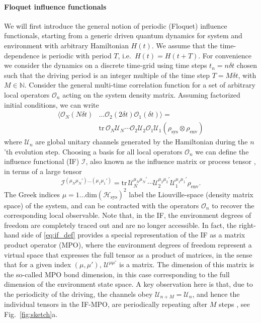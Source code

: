 \documentclass[aps,prb, twocolumn,superscriptaddress]{revtex4-2}
\newcommand{\braket}[1]{\langle#1\rangle}
\newcommand{\tr}{\mathrm{tr}}
\begin{document}
\paragraph*{Floquet influence functionals}

We will first introduce the general notion of periodic (Floquet) influence functionals, starting from a generic driven quantum dynamics for system and environment with arbitrary Hamiltonian $H(t)$. We assume that the time-dependence is periodic with period $T$, i.e.~$H(t)=H(t+T)$. For convenience we consider the dynamics on a discrete time-grid using time steps $t_n=n\delta t$ chosen such that the driving period is an integer multiple of the time step $T=M\delta t$, with $M\in \mathbb{N}$. Consider the general multi-time correlation function for a set of arbitrary local operators $\mathcal{O}_n$ acting on the system density matrix. Assuming factorized initial conditions, we can write
\begin{equation}\label{eq:cf}
\begin{split}
        \braket{\mathcal{O}_N(N\delta t)&\ldots \mathcal{O}_2(2\delta t) \mathcal{O}_1(\delta t)}=\\&
    \tr\, \mathcal{O}_N\mathcal{U}_N\cdots \mathcal{O}_2 \mathcal{U}_2\mathcal{O}_1\mathcal{U}_1(\rho_\mathrm{sys}\otimes\rho_\mathrm{env})
\end{split}
\end{equation}
where $\mathcal{U}_n$ are global unitary channels generated by the Hamiltonian during the $n$'th evolution step. Choosing a basis for all local operators $\mathcal{O}_n$ we can define the influence functional \cite{feynman63} (IF) $\mathcal{I}$, also known as the influence matrix \cite{Sonner2021Dec} or process tensor \cite{Jorgensen2019Dec,backerVerifyingQuantumMemory2025}, in terms of a large tensor \cite{Pollock2018Jan,Cygorek2021Jan,Sonner2021Dec}
\begin{equation}\label{eq:if_def}
    \mathcal{I}^{(\mu_N\mu_N')...(\mu_1\mu_1')}=\tr\,\mathcal{U}_N^{\mu_N\mu_N'}\cdots\mathcal{U}^{\mu_2\mu_2'}_2\mathcal{U}_1^{\mu_1\mu_1'}\rho_\mathrm{env}.
\end{equation}
The Greek indices $\mu=1\ldots \mathrm{dim}(\mathcal{H}_\mathrm{sys})^2$ label the Liouville-space (density matrix space) of the system, and can be contracted with the operators $\mathcal{O}_n$ to recover the corresponding local observable. Note that, in the IF, the environment degrees of freedom are completely traced out and are no longer accessible. In fact, the right-hand side of \eqref{eq:if_def} provides a special representation of the IF as a matrix product operator (MPO), where the environment degrees of freedom represent a virtual space that expresses the full tensor as a product of matrices, in the sense that for a given index $(\mu,\mu')$, $\mathcal{U}^{\mu\mu'}$ is a matrix. The dimension of this matrix is the so-called MPO bond dimension, in this case corresponding to the full dimension of the environment state space. A key observation here is that, due to the periodicity of the driving, the channels obey $\mathcal{U}_{n+M}=\mathcal{U}_n$, and hence the individual tensors in the IF-MPO, are periodically repeating after $M$ steps \cite{Lerose2021May}, see Fig.~\ref{fig:sketch}a.
\end{document}
